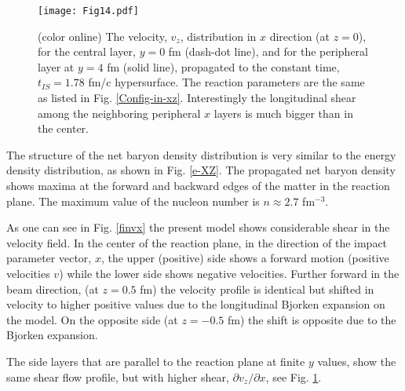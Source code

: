 \documentclass[aps,prc,twocolumn,floatfix,showpacs,a4paper,
nofootinbib,amsmath,amssymb]{revtex4-1}
\begin{document}
\begin{figure}[htb]     %
\begin{center}
\resizebox{1.01\columnwidth}{!}
{\texttt{[image: Fig14.pdf]}}
\caption{ (color online)
The velocity, $v_z$, distribution in $x$ direction (at $z = 0$), 
for the central layer, $y = 0$ fm (dash-dot line), and for the 
 peripheral layer at $y = 4$ fm (solid line),
propagated to the constant time, $t_{IS} = 1.78$ fm/c hypersurface. 
The reaction parameters are the same as 
listed in Fig. \ref{Config-in-xz}. Interestingly the longitudinal
shear among the neighboring peripheral $x$ layers is much bigger than in the center.
}
\label{vxdy}
\end{center}
\end{figure}        %
%




The structure of the net baryon density distribution is very similar to the energy density distribution, 
as shown in Fig. \ref{e-XZ}. The propagated net baryon density shows maxima at the forward and 
backward edges of the matter in the reaction plane.  The maximum value of the nucleon number is $n \approx 2.7$ fm$^{-3}$.


As one can see in Fig. \ref{finvx} the present model shows considerable shear in the velocity field.
In the center of the reaction plane, in the direction of the impact parameter
vector, $x$, the upper (positive) side shows a forward motion  (positive velocities $v$) while the lower side shows negative velocities. Further forward in the beam  direction, (at $z=0.5$ fm) the velocity profile is identical but shifted in velocity to higher  positive values due to the longitudinal Bjorken expansion on the model.  On the opposite side (at $z=-0.5$ fm) the shift is opposite due to the Bjorken expansion.



The side layers that are parallel to the reaction plane
at finite $y$ values, show the same shear flow profile,
but with higher shear, $\partial v_z / \partial x$, see 
Fig. \ref{vxdy}.
\end{document}
